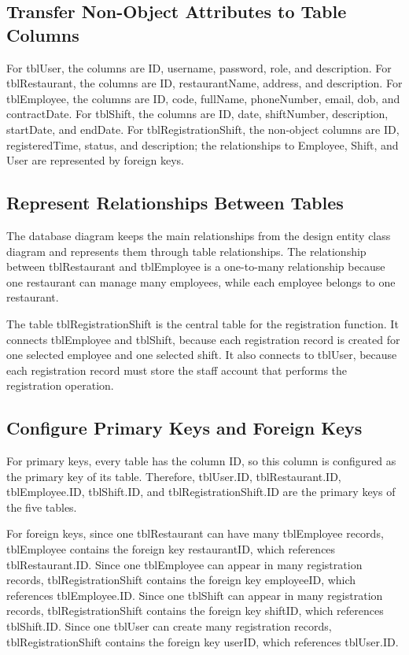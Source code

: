 \subsection{Transfer Non-Object Attributes to Table Columns}


For tblUser, the columns are ID, username, password, role, and description. For tblRestaurant, the columns are ID, restaurantName, address, and description. For tblEmployee, the columns are ID, code, fullName, phoneNumber, email, dob, and contractDate. For tblShift, the columns are ID, date, shiftNumber, description, startDate, and endDate. For tblRegistrationShift, the non-object columns are ID, registeredTime, status, and description; the relationships to Employee, Shift, and User are represented by foreign keys.

\subsection{Represent Relationships Between Tables}

The database diagram keeps the main relationships from the design entity class diagram and represents them through table relationships. The relationship between tblRestaurant and tblEmployee is a one-to-many relationship because one restaurant can manage many employees, while each employee belongs to one restaurant.

The table tblRegistrationShift is the central table for the registration function. It connects tblEmployee and tblShift, because each registration record is created for one selected employee and one selected shift. It also connects to tblUser, because each registration record must store the staff account that performs the registration operation.

\subsection{Configure Primary Keys and Foreign Keys}

For primary keys, every table has the column ID, so this column is configured as the primary key of its table. Therefore, tblUser.ID, tblRestaurant.ID, tblEmployee.ID, tblShift.ID, and tblRegistrationShift.ID are the primary keys of the five tables.

For foreign keys, since one tblRestaurant can have many tblEmployee records, tblEmployee contains the foreign key restaurantID, which references tblRestaurant.ID. Since one tblEmployee can appear in many registration records, tblRegistrationShift contains the foreign key employeeID, which references tblEmployee.ID. Since one tblShift can appear in many registration records, tblRegistrationShift contains the foreign key shiftID, which references tblShift.ID. Since one tblUser can create many registration records, tblRegistrationShift contains the foreign key userID, which references tblUser.ID.

